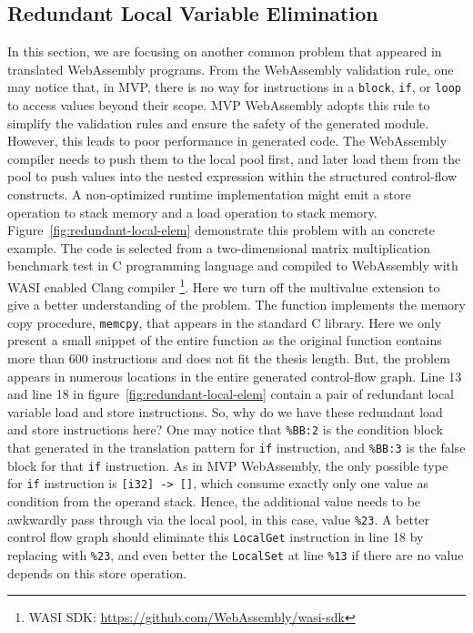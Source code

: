 \subsection{Redundant Local Variable Elimination}

In this section, we are focusing on another common problem that appeared in translated WebAssembly programs. From the WebAssembly validation rule, one may notice that, in MVP, there is no way for instructions in a \texttt{block}, \texttt{if}, or \texttt{loop} to access values beyond their scope. MVP WebAssembly adopts this rule to simplify the validation rules and ensure the safety of the generated module. However, this leads to poor performance in generated code. The WebAssembly compiler needs to push them to the local pool first, and later load them from the pool to push values into the nested expression within the structured control-flow constructs. A non-optimized runtime implementation might emit a store operation to stack memory and a load operation to stack memory. Figure~\ref{fig:redundant-local-elem} demonstrate this problem with an concrete example. The code is selected from a two-dimensional matrix multiplication benchmark test in C programming language and compiled to WebAssembly with WASI enabled Clang compiler \footnote{WASI SDK: \url{https://github.com/WebAssembly/wasi-sdk}}. Here we turn off the multivalue extension to give a better understanding of the problem. The function implements the memory copy procedure, \texttt{memcpy}, that appears in the standard C library. Here we only present a small snippet of the entire function as the original function contains more than 600 instructions and does not fit the thesis length. But, the problem appears in numerous locations in the entire generated control-flow graph. Line 13 and line 18 in figure~\ref{fig:redundant-local-elem} contain a pair of redundant local variable load and store instructions. So, why do we have these redundant load and store instructions here? One may notice that \texttt{\%BB:2} is the condition block that generated in the translation pattern for \texttt{if} instruction, and \texttt{\%BB:3} is the false block for that \texttt{if} instruction. As in MVP WebAssembly, the only possible type for \texttt{if} instruction is \texttt{[i32] -> []}, which consume exactly only one value as condition from the operand stack. Hence, the additional value needs to be awkwardly pass through via the local pool, in this case, value \texttt{\%23}. A better control flow graph should eliminate this \texttt{LocalGet} instruction in line 18 by replacing with \texttt{\%23}, and even better the \texttt{LocalSet} at line \texttt{\%13} if there are no value depends on this store operation.

